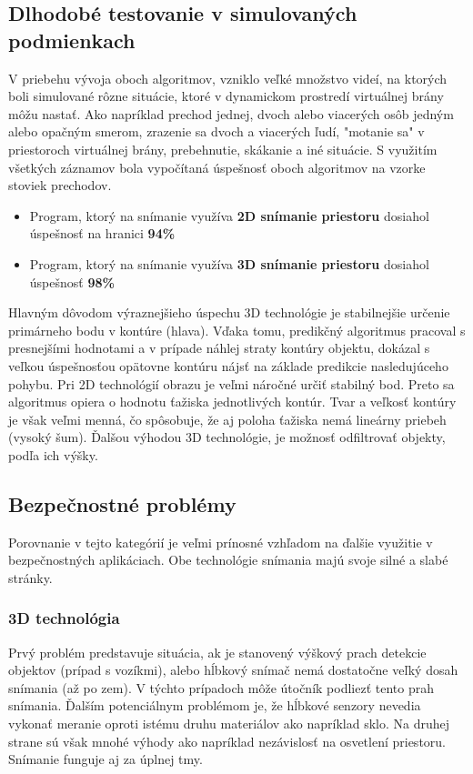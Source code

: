 \subsection{Dlhodobé testovanie v simulovaných podmienkach}
V priebehu vývoja oboch algoritmov, vzniklo veľké množstvo videí, na ktorých boli simulované rôzne situácie, ktoré v dynamickom prostredí virtuálnej brány môžu nastať. Ako napríklad prechod jednej, dvoch alebo viacerých osôb jedným alebo opačným smerom, zrazenie sa dvoch a viacerých ľudí, "motanie sa" v priestoroch virtuálnej brány, prebehnutie, skákanie a iné situácie. S využitím všetkých záznamov bola vypočítaná úspešnosť oboch algoritmov na vzorke stoviek prechodov.    

\begin{itemize}
\item Program, ktorý na snímanie využíva \textbf{2D snímanie priestoru} dosiahol úspešnosť na hranici \textbf{94\%}
\item Program, ktorý na snímanie využíva \textbf{3D snímanie priestoru} dosiahol úspešnosť \textbf{98\%}
\end{itemize}

Hlavným dôvodom výraznejšieho úspechu 3D technológie je stabilnejšie určenie primárneho bodu v kontúre (hlava). Vďaka tomu, predikčný algoritmus pracoval s presnejšími hodnotami a v prípade náhlej straty kontúry objektu, dokázal s veľkou úspešnosťou opätovne kontúru nájsť na základe predikcie nasledujúceho pohybu. Pri 2D technológií obrazu je veľmi náročné určiť stabilný bod. Preto sa algoritmus opiera o hodnotu ťažiska jednotlivých kontúr. Tvar a veľkosť kontúry je však veľmi menná, čo spôsobuje, že aj poloha ťažiska nemá lineárny priebeh (vysoký šum). Ďalšou výhodou 3D technológie, je možnosť odfiltrovať objekty, podľa ich výšky.

\vspace{5mm}


\subsection{Bezpečnostné problémy}
Porovnanie v tejto kategórií je veľmi prínosné vzhľadom na ďalšie využitie v bezpečnostných aplikáciach. Obe technológie snímania majú svoje silné a slabé stránky.

\subsubsection{3D technológia}
Prvý problém predstavuje situácia, ak je stanovený výškový prach detekcie objektov (prípad s vozíkmi), alebo hĺbkový snímač nemá dostatočne veľký dosah snímania (až po zem). V týchto prípadoch môže útočník podliezť tento prah snímania. Ďalším potenciálnym problémom je, že hĺbkové senzory nevedia vykonať meranie oproti istému druhu materiálov ako napríklad sklo. Na druhej strane sú však mnohé výhody ako napríklad  nezávislosť na osvetlení priestoru. Snímanie funguje aj za úplnej tmy. 

